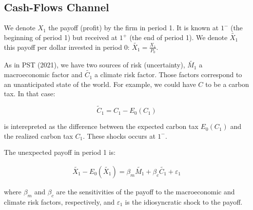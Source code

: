 \subsection{Cash-Flows Channel}

We denote $X_1$ the payoff (profit) by the
firm in period 1. It is known at $1^{-}$ (the beginning
of period 1) but received at $1^{+}$ (the end of period 1).
We denote $\tilde{X_1}$ this payoff per dollar 
invested in period 0: $\tilde{X_1} = \frac{X_1}{P_0}$.

As in PST (2021), we have two sources of risk (uncertainty), $\tilde{M_1}$
a macroeconomic factor and $\tilde{C_1}$ a climate risk factor.
Those factors correspond to an unanticipated state of the world. 
For example, we could have $C$ to be a carbon tax. In that case:

\begin{equation}
    \tilde{C}_1 = C_1 - E_0(C_1)
\end{equation}

is interepreted as the difference between the expected carbon tax 
$E_0(C_1)$ and the realized carbon tax $C_1$.
These shocks occurs at $1^{-}$.

The unexpected payoff in period 1 is:

\begin{equation}
    \begin{aligned}
    \tilde{X_1} - E_0(\tilde{X_1}) = \beta_m \tilde{M_1} + \beta_{c} \tilde{C_1} + \varepsilon_1
    \end{aligned}
\end{equation}

where $\beta_m$ and $\beta_{c}$ are the sensitivities of the payoff to the macroeconomic and climate risk factors, respectively, 
and $\varepsilon_1$ is the idiosyncratic shock to the payoff.


